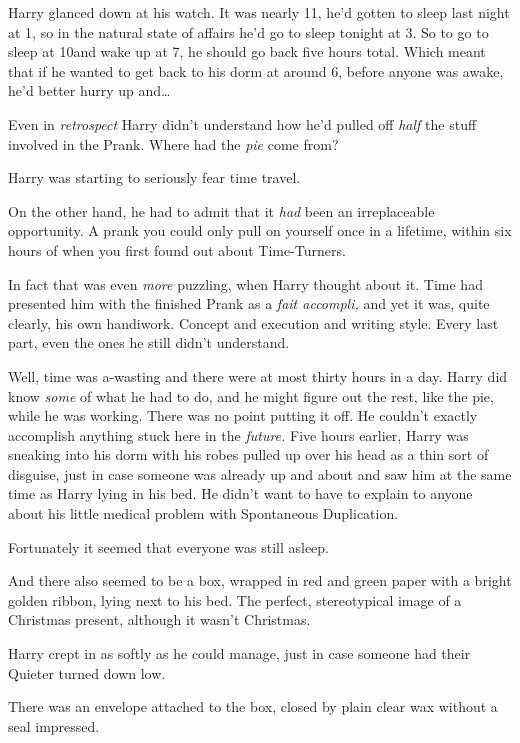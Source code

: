 Harry glanced down at his watch. It was nearly 11\AM, he'd gotten to sleep last 
night at 1\AM, so in the natural state of affairs he'd go to sleep tonight at 
3\AM. So to go to sleep at 10\PM and wake up at 7\AM, he should go back five hours 
total. Which meant that if he wanted to get back to his dorm at around 6\AM, 
before anyone was awake, he'd better hurry up and{\ldots}

Even in \emph{retrospect} Harry didn't understand how he'd pulled off 
\emph{half} the stuff involved in the Prank. Where had the \emph{pie} come from?

Harry was starting to seriously fear time travel.

On the other hand, he had to admit that it \emph{had} been an irreplaceable 
opportunity. A prank you could only pull on yourself once in a lifetime, within 
six hours of when you first found out about Time-Turners.

In fact that was even \emph{more} puzzling, when Harry thought about it. Time 
had presented him with the finished Prank as a \emph{fait accompli,} and yet it 
was, quite clearly, his own handiwork. Concept and execution and writing style. 
Every last part, even the ones he still didn't understand.

Well, time was a-wasting and there were at most thirty hours in a day. Harry 
did know \emph{some} of what he had to do, and he might figure out the rest, 
like the pie, while he was working. There was no point putting it off. He 
couldn't exactly accomplish anything stuck here in the \emph{future.}
\sbreak
Five hours earlier, Harry was sneaking into his dorm with his robes pulled up 
over his head as a thin sort of disguise, just in case someone was already up 
and about and saw him at the same time as Harry lying in his bed. He didn't 
want to have to explain to anyone about his little medical problem with 
Spontaneous Duplication.

Fortunately it seemed that everyone was still asleep.

And there also seemed to be a box, wrapped in red and green paper with a bright 
golden ribbon, lying next to his bed. The perfect, stereotypical image of a 
Christmas present, although it wasn't Christmas.

Harry crept in as softly as he could manage, just in case someone had their 
Quieter turned down low.

There was an envelope attached to the box, closed by plain clear wax without a 
seal impressed.

